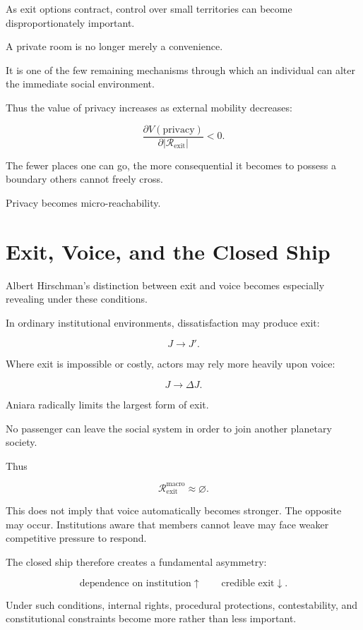 \documentclass[11pt,oneside]{book}
\theoremstyle{definition}
\theoremstyle{remark}
\newcommand{\R}{\mathcal{R}}
\begin{document}
As exit options contract, control over small territories can become disproportionately important.

A private room is no longer merely a convenience.

It is one of the few remaining mechanisms through which an individual can alter the immediate social environment.

Thus the value of privacy increases as external mobility decreases:

\[
\frac{\partial V(\text{privacy})}
{\partial |\R_{\mathrm{exit}}|}
<0.
\]

The fewer places one can go, the more consequential it becomes to possess a boundary others cannot freely cross.

Privacy becomes micro-reachability.

\section{Exit, Voice, and the Closed Ship}

Albert Hirschman's distinction between exit and voice becomes especially revealing under these conditions.

In ordinary institutional environments, dissatisfaction may produce exit:

\[
J\rightarrow J'.
\]

Where exit is impossible or costly, actors may rely more heavily upon voice:

\[
J\rightarrow\Delta J.
\]

Aniara radically limits the largest form of exit.

No passenger can leave the social system in order to join another planetary society.

Thus

\[
\R_{\mathrm{exit}}^{\mathrm{macro}}
\approx
\varnothing.
\]

This does not imply that voice automatically becomes stronger. The opposite may occur. Institutions aware that members cannot leave may face weaker competitive pressure to respond.

The closed ship therefore creates a fundamental asymmetry:

\[
\text{dependence on institution}\uparrow
\qquad
\text{credible exit}\downarrow.
\]

Under such conditions, internal rights, procedural protections, contestability, and constitutional constraints become more rather than less important.
\end{document}
